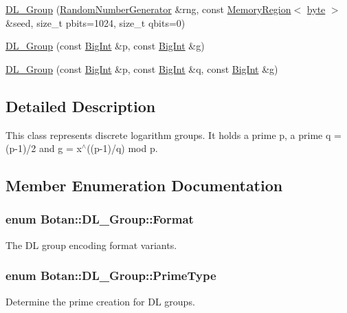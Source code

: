 \begin{DoxyCompactItemize}
\item 
\hyperlink{classBotan_1_1DL__Group_a203787aeb963dda11c063daa59037abd}{D\-L\-\_\-\-Group} (\hyperlink{classBotan_1_1RandomNumberGenerator}{Random\-Number\-Generator} \&rng, const \hyperlink{classBotan_1_1MemoryRegion}{Memory\-Region}$<$ \hyperlink{namespaceBotan_a7d793989d801281df48c6b19616b8b84}{byte} $>$ \&seed, size\-\_\-t pbits=1024, size\-\_\-t qbits=0)
\item 
\hyperlink{classBotan_1_1DL__Group_accd105ceba773e6d0f2a3410c0f407a1}{D\-L\-\_\-\-Group} (const \hyperlink{classBotan_1_1BigInt}{Big\-Int} \&p, const \hyperlink{classBotan_1_1BigInt}{Big\-Int} \&g)
\item 
\hyperlink{classBotan_1_1DL__Group_a111039cbc3e71690c29a6607c1c8ca18}{D\-L\-\_\-\-Group} (const \hyperlink{classBotan_1_1BigInt}{Big\-Int} \&p, const \hyperlink{classBotan_1_1BigInt}{Big\-Int} \&q, const \hyperlink{classBotan_1_1BigInt}{Big\-Int} \&g)
\end{DoxyCompactItemize}


\subsection{Detailed Description}
This class represents discrete logarithm groups. It holds a prime p, a prime q = (p-\/1)/2 and g = x$^\wedge$((p-\/1)/q) mod p. 

\subsection{Member Enumeration Documentation}
\hypertarget{classBotan_1_1DL__Group_ac602a30420ceec03fa181a10b09312a7}{
\subsubsection[{Format}]{\setlength{\rightskip}{0pt plus 5cm}enum {\bf Botan\-::\-D\-L\-\_\-\-Group\-::\-Format}}}\label{classBotan_1_1DL__Group_ac602a30420ceec03fa181a10b09312a7}
The D\-L group encoding format variants. \hypertarget{classBotan_1_1DL__Group_ab5b6922453bcee11d6a4b3ebcf36f54b}{
\subsubsection[{Prime\-Type}]{\setlength{\rightskip}{0pt plus 5cm}enum {\bf Botan\-::\-D\-L\-\_\-\-Group\-::\-Prime\-Type}}}\label{classBotan_1_1DL__Group_ab5b6922453bcee11d6a4b3ebcf36f54b}
Determine the prime creation for D\-L groups. 

